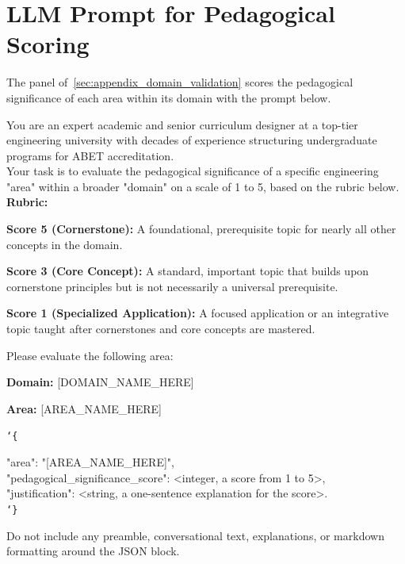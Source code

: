 \section{LLM Prompt for Pedagogical Scoring}
\label{sec:appendix_significance_scoring}

The panel of~\autoref{sec:appendix_domain_validation} scores the pedagogical significance of each
area within its domain with the prompt below.

\begin{tcolorbox}[
    colback=gray!5,
    colframe=gray!30,
    boxrule=0.4pt,
    arc=2pt,
    left=6pt,
    right=6pt,
    top=6pt,
    bottom=6pt,
    breakable
]
\ttfamily\small
You are an expert academic and senior curriculum designer at a top-tier engineering university with decades of experience structuring undergraduate programs for ABET accreditation. \\

Your task is to evaluate the pedagogical significance of a specific engineering "area" within a broader "domain" on a scale of 1 to 5, based on the rubric below. \\

\textbf{Rubric:}
\par\medskip\noindent
\textbf{Score 5 (Cornerstone):} A
foundational, prerequisite topic for nearly all other concepts in the domain.
\par\medskip\noindent
\textbf{Score 3 (Core Concept):} A standard, important topic that builds upon cornerstone principles but is not necessarily a universal prerequisite.
\par\medskip\noindent
\textbf{Score 1 (Specialized Application):} A focused application or an
integrative topic taught after cornerstones and core concepts are mastered.
\par\medskip

Please evaluate the following area:
\par\medskip\noindent
\textbf{Domain:} [DOMAIN\_NAME\_HERE]
\par\noindent
\textbf{Area:} [AREA\_NAME\_HERE]
\par\bigskip

\noindent\bgroup\ttfamily
\texttt{\char`\{}

\par\medskip
\hspace*{1em}"area": "[AREA\_NAME\_HERE]",\\
\hspace*{1em}"pedagogical\_significance\_score": <integer, a score from 1 to 5>,\\
\hspace*{1em}"justification": <string, a one-sentence explanation for the score>.\\
\vspace{2pt}
\texttt{\char`\}}
\egroup
\par\bigskip

Do not include any preamble, conversational text, explanations, or markdown formatting around the JSON block.
\end{tcolorbox}

